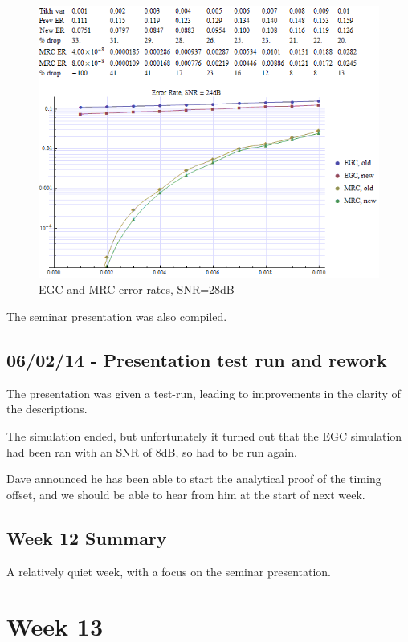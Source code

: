 \begin{figure}[htbp]
\centering
\includegraphics{../plots/egc_mrc_28db.png}
\caption{EGC and MRC error rates, SNR=28dB}
\end{figure}

The seminar presentation was also compiled.

\subsection{06/02/14 - Presentation test run and rework}

The presentation was given a test-run, leading to improvements in the
clarity of the descriptions.

The simulation ended, but unfortunately it turned out that the EGC
simulation had been ran with an SNR of 8dB, so had to be run again.

Dave announced he has been able to start the analytical proof of the
timing offset, and we should be able to hear from him at the start of
next week.

\subsection{Week 12 Summary}

A relatively quiet week, with a focus on the seminar presentation.

\section{Week 13}

